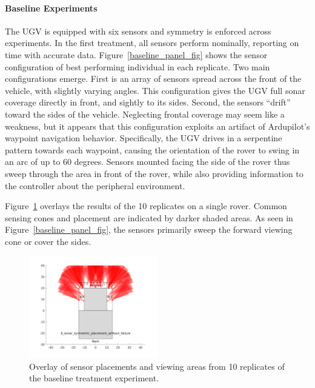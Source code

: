 \paragraph{Baseline Experiments}
The UGV is equipped with six sensors and symmetry is enforced across experiments.  
%
In the first treatment, all sensors perform nominally, reporting on time with accurate data.  
%
Figure~\ref{baseline_panel_fig} shows the sensor configuration of best performing
individual in each replicate.  
%
Two main configurations emerge.
%
First is an array of sensors spread across the front of the vehicle,
with slightly varying angles. 
%
This configuration gives the UGV full sonar coverage directly in front, and sightly to its sides. 
%
Second, the sensors ``drift'' toward the sides of the vehicle.
%
Neglecting frontal coverage may seem like a weakness, but it appears that this configuration exploits an artifact of Ardupilot's waypoint navigation behavior. 
%
Specifically, the UGV drives in a serpentine pattern towards each waypoint, causing the orientation of the rover to swing in an arc of up to 60 degrees. 
%
Sensors mounted facing the side of the rover thus sweep through the area in front of the rover, while also providing information to the controller about the peripheral environment.



Figure~\ref{baseline_overlay_fig} overlays the results of the 10 replicates
on a single rover.
%
Common sensing cones and placement are indicated by darker shaded areas.  
%
As seen in Figure~\ref{baseline_panel_fig}, the sensors primarily sweep the forward viewing cone or cover the sides.

\begin{figure}[ht]
	\centering
    \includegraphics[width=0.5\textwidth]{Figures/6_sonar_symmetric_placement_without_failure_sensor_viewing_area_overlay.png}
    \vspace{-0.45in}
    \caption{Overlay of sensor placements and viewing areas from 10 replicates of the baseline treatment experiment.}
    \label{baseline_overlay_fig}
\end{figure}



